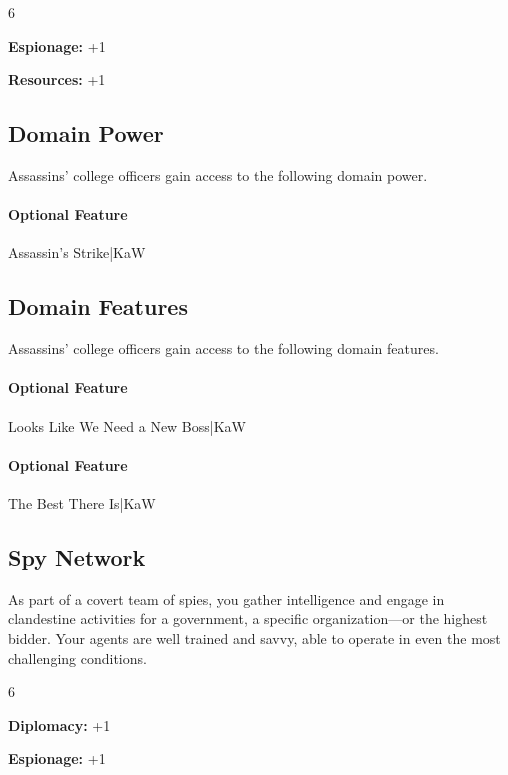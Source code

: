 \documentclass[10pt,a4paper,twoside,bg=print,twocolumn,openany,nodeprecatedcode]{dndbook}
\begin{document}
\begin{itemize}
\begin{multicols}{6}
\item \textbf{Espionage:} +1
\item \textbf{Resources:} +1
\end{multicols}

\end{itemize}

\subsection{Domain Power}
Assassins' college officers gain access to the following domain power.

\paragraph{Optional Feature}
Assassin's Strike|KaW

\subsection{Domain Features}
Assassins' college officers gain access to the following domain features.

\paragraph{Optional Feature}
Looks Like We Need a New Boss|KaW

\paragraph{Optional Feature}
The Best There Is|KaW

\subsection{Spy Network}
As part of a covert team of spies, you gather intelligence and engage in clandestine activities for a government, a specific organization—or the highest bidder. Your agents are well trained and savvy, able to operate in even the most challenging conditions.

{\par \vspace { 9pt plus 3pt minus 3pt } \noindent  {} \nopagebreak }

\begin{itemize}
\begin{multicols}{6}
\item \textbf{Diplomacy:} +1
\item \textbf{Espionage:} +1
\end{multicols}

\end{itemize}
\end{document}
